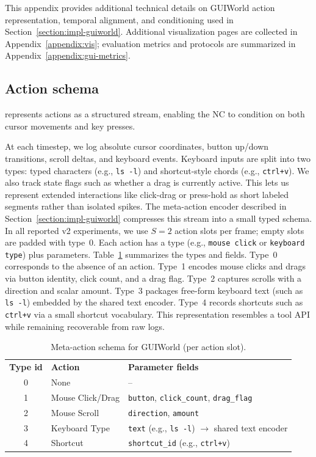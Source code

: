 \noindent This appendix provides additional technical details on GUIWorld action representation, temporal alignment, and conditioning used in Section~\ref{section:impl-guiworld}.
Additional visualization pages are collected in Appendix~\ref{appendix:vis}; evaluation metrics and protocols are summarized in Appendix~\ref{appendix:gui-metrics}.

\subsection{Action schema}
\ncguiworld{} represents actions as a structured stream, enabling the NC to condition on both cursor movements and key presses.

At each timestep, we log absolute cursor coordinates, button up/down transitions, scroll deltas, and keyboard events.
Keyboard inputs are split into two types: typed characters (e.g., \texttt{ls -l}) and shortcut-style chords (e.g., \texttt{ctrl+v}).
We also track state flags such as whether a drag is currently active.
This lets us represent extended interactions like click-drag or press-hold as short labeled segments rather than isolated spikes.
The meta-action encoder described in Section~\ref{section:impl-guiworld} compresses this stream into a small typed schema.
In all reported v2 experiments, we use $S{=}2$ action slots per frame; empty slots are padded with type~0.
Each action has a type (e.g., \texttt{mouse click} or \texttt{keyboard type}) plus parameters.
Table~\ref{tab:meta-action-schema} summarizes the types and fields.
Type~0 corresponds to the absence of an action.
Type~1 encodes mouse clicks and drags via button identity, click count, and a drag flag.
Type~2 captures scrolls with a direction and scalar amount.
Type~3 packages free-form keyboard text (such as \texttt{ls -l}) embedded by the shared text encoder.
Type~4 records shortcuts such as \texttt{ctrl+v} via a small shortcut vocabulary.
This representation resembles a tool API while remaining recoverable from raw logs.

\begin{table}[h]
  \centering
  \small
  \setlength{\tabcolsep}{6pt}
  \renewcommand{\arraystretch}{1.05}
  \caption{Meta-action schema for GUIWorld (per action slot).}
  \label{tab:meta-action-schema}
  \begin{tabularx}{\linewidth}{@{}c l >{\raggedright\arraybackslash}X@{}}
    \toprule
    \rowcolor{metablue!16}\textbf{Type id} & \textbf{Action} & \textbf{Parameter fields} \\
    0 & None & -- \\
    1 & Mouse Click/Drag & \texttt{button}, \texttt{click\_count}, \texttt{drag\_flag} \\
    2 & Mouse Scroll & \texttt{direction}, \texttt{amount} \\
    3 & Keyboard Type & \texttt{text} (e.g., \texttt{ls -l}) $\rightarrow$ shared text encoder \\
    4 & Shortcut & \texttt{shortcut\_id} (e.g., \texttt{ctrl+v}) \\
    \bottomrule
  \end{tabularx}
\end{table}

